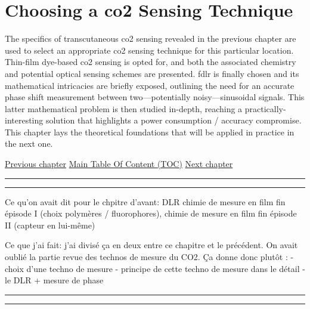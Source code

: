 \chapter{Choosing a \texorpdfstring{\gls{co2}}{CO2} Sensing Technique}\label{chap:choosing_techno}

\begin{tldrbox}
	
	The specifics of transcutaneous \gls{co2} sensing revealed in the previous chapter are used to select an appropriate \gls{co2} sensing technique for this particular location. Thin-film dye-based \gls{co2} sensing is opted for, and both the associated chemistry and potential optical sensing schemes are presented. \Gls{fdlr} is finally chosen and its mathematical intricacies are briefly exposed, outlining the need for an accurate phase shift measurement between two---potentially noisy---sinusoidal signals. This latter mathematical problem is then studied in-depth, reaching a practically-interesting solution that highlights a power consumption / accuracy compromise. This chapter lays the theoretical foundations that will be applied in practice in the next one.
	
	\tcblower
	
	\hyperref[chap:tcco2]{Previous chapter} \hfill \hyperref[chapter:toc]{Main Table Of Content (TOC)} \hfill \hyperref[chap:thin_film]{Next chapter}
	
\end{tldrbox}

\vspace{.3cm}\hrule\vspace{.1cm}\hrule\vspace{.3cm}

Ce qu'on avait dit pour le chpitre d'avant: DLR 
chimie de mesure en film fin épisode I (choix polymères / fluorophores), chimie de mesure en film fin épisode II (capteur en lui-même)

Ce que j'ai fait: j'ai divisé ça en deux entre ce chapitre et le précédent. On avait oublié la partie revue des technos de mesure du CO2. Ça donne donc plutôt :
- choix d'une techno de mesure
- principe de cette techno de mesure dans le détail
- le DLR + mesure de phase

\vspace{.3cm}\hrule\vspace{.1cm}\hrule\vspace{.3cm}

